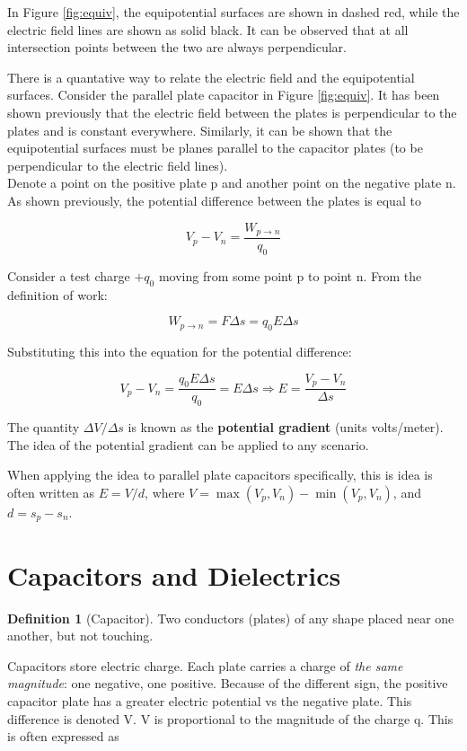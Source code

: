 \documentclass[12pt, a4paper]{article}
\theoremstyle{definition}
\newtheorem{definition}{Definition}
\begin{document}
In Figure \ref{fig:equiv}, the equipotential surfaces are shown in dashed red, while the electric field lines are shown as solid black.
It can be observed that at all intersection points between the two are always perpendicular.

There is a quantative way to relate the electric field and the equipotential surfaces.
Consider the parallel plate capacitor in Figure \ref{fig:equiv}.
It has been shown previously that the electric field between the plates is perpendicular to the plates and is constant everywhere.
Similarly, it can be shown that the equipotential surfaces must be planes parallel to the capacitor plates (to be perpendicular to the electric field lines).\\

Denote a point on the positive plate p and another point on the negative plate n.
As shown previously, the potential difference between the plates is equal to

\[V_p - V_n = \frac{W_{p \rightarrow n}}{q_0}\]

Consider a test charge $+q_0$ moving from some point p to point n.
From the definition of work:

\[W_{p \rightarrow n} = F\Delta s = q_0E\Delta s\]

Substituting this into the equation for the potential difference:

\[V_p - V_n = \frac{q_0E\Delta s}{q_0} = E\Delta s \Rightarrow E = \frac{V_p - V_n}{\Delta s}\]

The quantity $\Delta V / \Delta s$ is known as the \textbf{potential gradient} (units volts/meter).
The idea of the potential gradient can be applied to any scenario.

When applying the idea to parallel plate capacitors specifically, this is idea is often written as $E=V/d$, where $V = \max(V_p, V_n) - \min(V_p, V_n)$, and $d = s_p - s_n$.

\section{Capacitors and Dielectrics}

\begin{definition}[Capacitor]
    Two conductors (plates) of any shape placed near one another, but not touching.
\end{definition}

Capacitors store electric charge.
Each plate carries a charge of \textit{the same magnitude}: one negative, one positive.
Because of the different sign, the positive capacitor plate has a greater electric potential vs the negative plate.
This difference is denoted V.
V is proportional to the magnitude of the charge q. This is often expressed as
\end{document}
